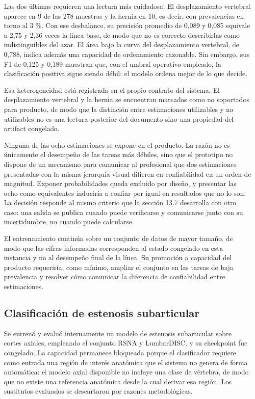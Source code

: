 Las dos últimas requieren una lectura más cuidadosa. El desplazamiento vertebral aparece en 9 de las 278 muestras y la hernia en 10, es decir, con prevalencias en torno al 3 \%. Con ese desbalance, su precisión promedio de 0,089 y 0,085 equivale a 2,75 y 2,36 veces la línea base, de modo que no es correcto describirlas como indistinguibles del azar. El área bajo la curva del desplazamiento vertebral, de 0,788, indica además una capacidad de ordenamiento razonable. Sin embargo, sus F1 de 0,125 y 0,189 muestran que, con el umbral operativo empleado, la clasificación positiva sigue siendo débil: el modelo ordena mejor de lo que decide.

Esa heterogeneidad está registrada en el propio contrato del sistema. El desplazamiento vertebral y la hernia se encuentran marcados como no soportados para producto, de modo que la distinción entre estimaciones utilizables y no utilizables no es una lectura posterior del documento sino una propiedad del artifact congelado.

Ninguna de las ocho estimaciones se expone en el producto. La razón no es únicamente el desempeño de las tareas más débiles, sino que el prototipo no dispone de un mecanismo para comunicar al profesional que dos estimaciones presentadas con la misma jerarquía visual difieren en confiabilidad en un orden de magnitud. Exponer probabilidades queda excluido por diseño, y presentar las ocho como equivalentes induciría a confiar por igual en resultados que no lo son. La decisión responde al mismo criterio que la sección 13.7 desarrolla con otro caso: una salida se publica cuando puede verificarse y comunicarse junto con su incertidumbre, no cuando puede calcularse.

El entrenamiento continúa sobre un conjunto de datos de mayor tamaño, de modo que las cifras informadas corresponden al estado congelado en esta instancia y no al desempeño final de la línea. Su promoción a capacidad del producto requeriría, como mínimo, ampliar el conjunto en las tareas de baja prevalencia y resolver cómo comunicar la diferencia de confiabilidad entre estimaciones.

\subsection{Clasificación de estenosis subarticular}

Se entrenó y evaluó internamente un modelo de estenosis subarticular sobre cortes axiales, empleando el conjunto RSNA y LumbarDISC, y su checkpoint fue congelado. La capacidad permanece bloqueada porque el clasificador requiere como entrada una región de interés anatómica que el sistema no genera de forma automática: el modelo axial disponible no incluye una clase de vértebra, de modo que no existe una referencia anatómica desde la cual derivar esa región. Los sustitutos evaluados se descartaron por razones metodológicas.

